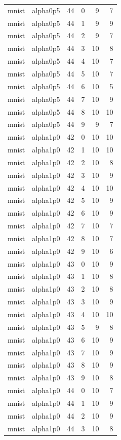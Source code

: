 \begin{tabular}{llrrrr}
mnist & alpha0p5 & 44 & 0 & 9 & 7 \\
mnist & alpha0p5 & 44 & 1 & 9 & 9 \\
mnist & alpha0p5 & 44 & 2 & 9 & 7 \\
mnist & alpha0p5 & 44 & 3 & 10 & 8 \\
mnist & alpha0p5 & 44 & 4 & 10 & 7 \\
mnist & alpha0p5 & 44 & 5 & 10 & 7 \\
mnist & alpha0p5 & 44 & 6 & 10 & 5 \\
mnist & alpha0p5 & 44 & 7 & 10 & 9 \\
mnist & alpha0p5 & 44 & 8 & 10 & 10 \\
mnist & alpha0p5 & 44 & 9 & 9 & 7 \\
mnist & alpha1p0 & 42 & 0 & 10 & 10 \\
mnist & alpha1p0 & 42 & 1 & 10 & 10 \\
mnist & alpha1p0 & 42 & 2 & 10 & 8 \\
mnist & alpha1p0 & 42 & 3 & 10 & 9 \\
mnist & alpha1p0 & 42 & 4 & 10 & 10 \\
mnist & alpha1p0 & 42 & 5 & 10 & 9 \\
mnist & alpha1p0 & 42 & 6 & 10 & 9 \\
mnist & alpha1p0 & 42 & 7 & 10 & 7 \\
mnist & alpha1p0 & 42 & 8 & 10 & 7 \\
mnist & alpha1p0 & 42 & 9 & 10 & 6 \\
mnist & alpha1p0 & 43 & 0 & 10 & 9 \\
mnist & alpha1p0 & 43 & 1 & 10 & 8 \\
mnist & alpha1p0 & 43 & 2 & 10 & 8 \\
mnist & alpha1p0 & 43 & 3 & 10 & 9 \\
mnist & alpha1p0 & 43 & 4 & 10 & 10 \\
mnist & alpha1p0 & 43 & 5 & 9 & 8 \\
mnist & alpha1p0 & 43 & 6 & 10 & 9 \\
mnist & alpha1p0 & 43 & 7 & 10 & 9 \\
mnist & alpha1p0 & 43 & 8 & 10 & 9 \\
mnist & alpha1p0 & 43 & 9 & 10 & 8 \\
mnist & alpha1p0 & 44 & 0 & 10 & 7 \\
mnist & alpha1p0 & 44 & 1 & 10 & 9 \\
mnist & alpha1p0 & 44 & 2 & 10 & 9 \\
mnist & alpha1p0 & 44 & 3 & 10 & 8 \\

\end{tabular}
